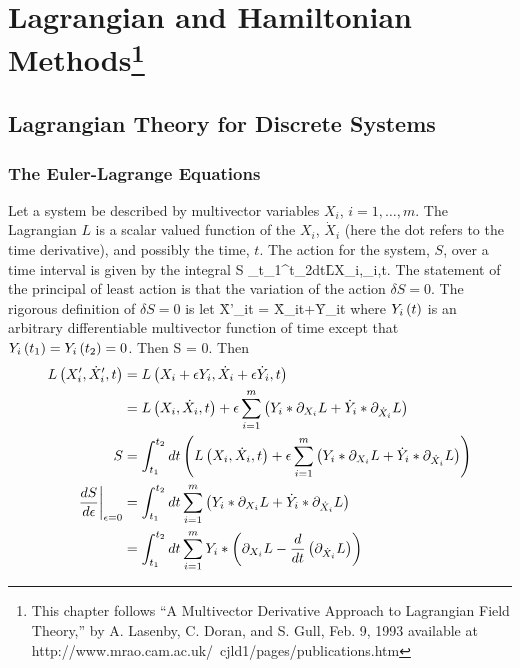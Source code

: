 \chapter[Lagrangian and Hamiltonian Methods]{Lagrangian and Hamiltonian Methods\footnote{This chapter follows ``A Multivector 
Derivative Approach to Lagrangian Field Theory,'' by A. Lasenby, C. Doran, and S. Gull, Feb. 9, 1993 available at http://www.mrao.cam.ac.uk/~cjld1/pages/publications.htm}}

\section{Lagrangian Theory for Discrete Systems}
\subsection{The Euler-Lagrange Equations}
Let a system be described by multivector variables $X_{i}$, $i=1,\dots,m$.  The Lagrangian $L$ is a scalar valued function of 
the $X_{i}$, $\dot{X}_{i}$ (here the dot refers to the time derivative), and possibly the time, $t$.  The action for the system, $S$,
over a time interval is given by the integral
\be
	S \equiv \int_{t_{1}}^{t_{2}}dt\f{L}{X_{i},_{i},t}.
\ee
The statement of the principal of least action is that the variation of the action $\delta S=0$.  The rigorous definition of $\delta S=0$ is
let 
\be
	\f{X'_{i}}{t} = \f{X_{i}}{t}+\epsilon\f{Y_{i}}{t}
\ee
where ${Y_{i}}\left ( {t} \right )$ is an arbitrary differentiable multivector function of time except that ${Y_{i}}\left ( {t_{1}} \right ) = {Y_{i}}\left ( {t_{2}} \right )=0$. Then
\be
	\delta S \equiv {} = 0.
\ee
Then
\begin{align}
    {L}\left ( {X'_{i},\dot{X}'_{i},t} \right ) &= {L}\left ( {X_{i}+\epsilon Y_{i},\dot{X}_{i}+\epsilon\dot{Y}_{i},t} \right ) \label{eq7_4a} \\
                                 &= {L}\left ( {X_{i},\dot{X}_{i},t} \right )+\epsilon\sum_{i=1}^{m}\left ( {Y_{i}*\partial_{X_{i}}{L}+\dot{Y}_{i}*\partial_{\dot{X}_{i}}{L}} \right ) \label{eq7_4b}\\
                               S &= \int_{t_{1}}^{t_{2}} dt\left ( {{L}\left ( {X_{i},\dot{X}_{i},t} \right )+\epsilon\sum_{i=1}^{m}\left ( {Y_{i}*\partial_{X_{i}}{L}
                                    +\dot{Y}_{i}*\partial_{\dot{X}_{i}}{L}} \right ) } \right ) \\
	\left . {\displaystyle\frac{d{S}}{d{\epsilon}}} \right |_{\epsilon=0} &= \int_{t_{1}}^{t_{2}}dt\sum_{i=1}^{m}\left ( {Y_{i}*\partial_{X_{i}}L+\dot{Y}_{i}*\partial_{\dot{X}_{i}}L} \right ) \label{eq7_4} \\
	                                       &= \int_{t_{1}}^{t_{2}}dt\sum_{i=1}^{m}Y_{i}*\left ( {\partial_{X_{i}}L-\displaystyle\frac{d{}}{d{t}}\left ( {\partial_{\dot{X}_{i}}L} \right )} \right ) \label{eq7_5}                               
\end{align}
